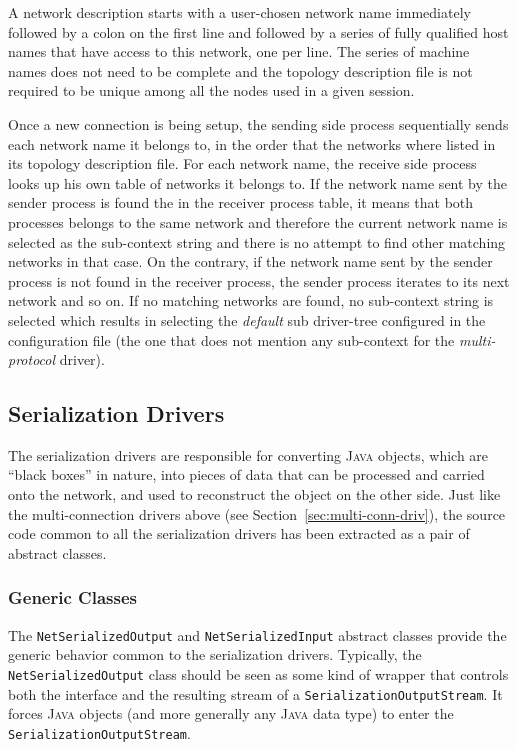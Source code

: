 \documentclass[11pt]{book}
\begin{document}
A network description starts with a user-chosen network name
immediately followed by a colon on the first line and followed by a
series of fully qualified host names that have access to this network,
one per line. The series of machine names does not need to be complete
and the topology description file is not required to be unique among
all the nodes used in a given session.

Once a new connection is being setup, the sending side process
sequentially sends each network name it belongs to, in the order that
the networks where listed in its topology description file. For each
network name, the receive side process looks up his own table of
networks it belongs to. If the network name sent by the sender process
is found the in the receiver process table, it means that both
processes belongs to the same network and therefore the current
network name is selected as the sub-context string and there is no
attempt to find other matching networks in that case. On the contrary,
if the network name sent by the sender process is not found in the
receiver process, the sender process iterates to its next network and
so on. If no matching networks are found, no sub-context string is
selected which results in selecting the \emph{default} sub driver-tree
configured in the configuration file (the one that does not mention
any sub-context for the \emph{multi-protocol} driver).

\subsection{Serialization Drivers}
\label{sec:seri-driv}
The serialization drivers are responsible for converting \textsc{Java}
objects, which are ``black boxes'' in nature, into pieces of data that
can be processed and carried onto the network, and used to reconstruct
the object on the other side. Just like the multi-connection drivers
above (see Section~\ref{sec:multi-conn-driv}), the source code common
to all the serialization drivers has been extracted as a pair of
abstract classes.

%
\subsubsection{Generic Classes}
\label{sec:generic-classes-1}
The \texttt{NetSerializedOutput} and \texttt{NetSerializedInput}
abstract classes provide the generic behavior common to the
serialization drivers. Typically, the \texttt{NetSerializedOutput}
class should be seen as some kind of wrapper that controls both the
interface and the resulting stream of a
\texttt{SerializationOutputStream}. It forces \textsc{Java} objects
(and more generally any \textsc{Java} data type) to enter the
\texttt{SerializationOutputStream}.
\end{document}
